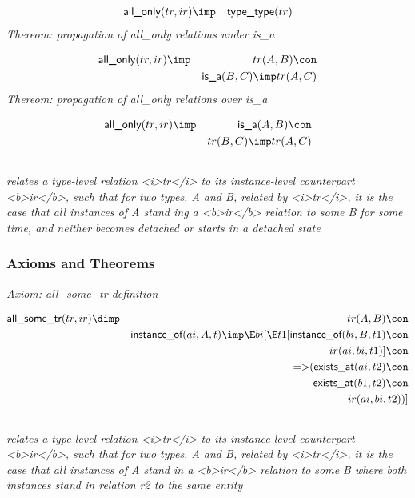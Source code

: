 \begin{eqnarray*}
 \pr{all\_only}(tr, ir) &\imp & \pr{type\_type}(tr) 
\end{eqnarray*}
\emph{Thereom: propagation of all\_only relations under is\_a}

\begin{eqnarray*}
 \pr{all\_only}(tr, ir) &\imp &tr(A, B) \con \\
&& \pr{is\_a}(B, C) \imp tr(A, C) 
\end{eqnarray*}
\emph{Thereom: propagation of all\_only relations over is\_a}

\begin{eqnarray*}
 \pr{all\_only}(tr, ir) &\imp & \pr{is\_a}(A, B) \con \\
&&tr(B, C) \imp tr(A, C) 
\end{eqnarray*}

\subsection{ }
\emph{relates a type-level relation <i>tr</i> to its instance-level counterpart <b>ir</b>, such that for two types, A and B, related by <i>tr</i>, it is the case that all instances of A stand ing a <b>ir</b> relation to some B for some time, and neither becomes detached or starts in a detached state}

\subsubsection{Axioms and Theorems}


\emph{Axiom: all\_some\_tr definition}

\begin{eqnarray*}
 \pr{all\_some\_tr}(tr, ir) &\dimp &tr(A, B) \con \\
&& \pr{instance\_of}(ai, A, t) \imp  \E bi[ \E t1[ \pr{instance\_of}(bi, B, t1) \con \\
&&ir(ai, bi, t1) ]\con \\
&& \pr{=>}( \pr{exists\_at}(ai, t2) \con \\
&& \pr{exists\_at}(b1, t2) \con \\
&&ir(ai, bi, t2) ) ]
\end{eqnarray*}

\subsection{ }
\emph{relates a type-level relation <i>tr</i> to its instance-level counterpart <b>ir</b>, such that for two types, A and B, related by <i>tr</i>, it is the case that all instances of A stand in a <b>ir</b> relation to some B where both instances stand in relation r2 to the same entity}

